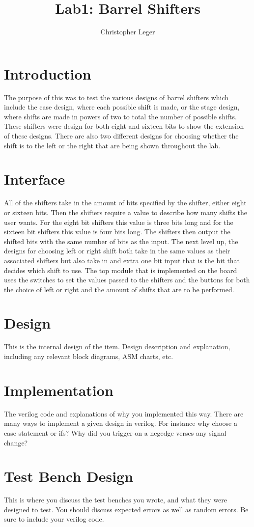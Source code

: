 \documentclass{article}\usepackage{graphicx} %
\author{Christopher Leger}
\title{Lab1: Barrel Shifters}
\begin{document}
\maketitle

\section{Introduction}
The purpose of this was to test the various designs of barrel shifters which include the case design, where each possible shift is made, or the stage design, where shifts are made in powers of two to total the number of possible shifts. These shifters were design for both eight and sixteen bits to show the extension of these designs. There are also two different designs for choosing whether the shift is to the left or the right that are being shown throughout the lab. 
\section{Interface}
All of the shifters take in the amount of bits specified by the shifter, either eight or sixteen bits. Then the shifters require a value to describe how many shifts the user wants. For the eight bit shifters this value is three bits long and for the sixteen bit shifters this value is four bits long. The shifters then output the shifted bits with the same number of bits as the input. The next level up, the designs for choosing left or right shift both take in the same values as their associated shifters but also take in and extra one bit input that is the bit that decides which shift to use. The top module that is implemented on the board uses the switches to set the values passed to the shifters and the buttons for both the choice of left or right and the amount of shifts that are to be performed. 
\section{Design}
This is the internal design of the item.  Design description and explanation, including any relevant block diagrams, ASM charts, etc.
\section{Implementation}
The verilog code and explanations of why you implemented this way.  There are many ways to implement a given design in verilog.  For instance why choose a case statement or ifs?  Why did you trigger on a negedge verses any signal change?
\section{Test Bench Design}
This is where you discuss the test benches you wrote, and what they were designed to test.  You should discuss expected errors as well as random errors.  Be sure to include your verilog code.
\end{document}
